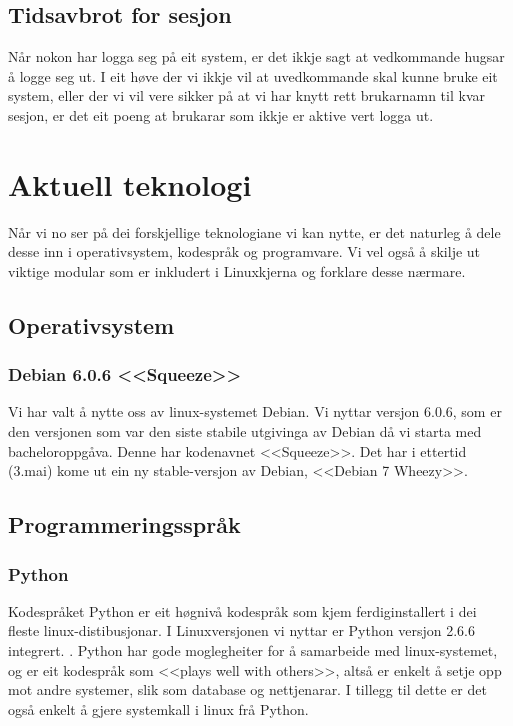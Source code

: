 \documentclass[nynorsk,12pt,a4paper,oneside]{book}
\begin{document}
\subsection{Tidsavbrot for sesjon}
Når nokon har logga seg på eit system, er det ikkje sagt at vedkommande hugsar å logge seg ut. I eit høve der vi ikkje vil at uvedkommande skal kunne bruke eit system, eller der vi vil vere sikker på at vi har knytt rett brukarnamn til kvar sesjon, er det eit poeng at brukarar som ikkje er aktive vert logga ut. 

\section{Aktuell teknologi}
Når vi no ser på dei forskjellige teknologiane vi kan nytte, er det naturleg å dele desse inn i operativsystem, kodespråk og programvare. Vi vel også å skilje ut viktige modular som er inkludert i Linuxkjerna og forklare desse nærmare.
\subsection{Operativsystem}
\subsubsection{Debian 6.0.6 <<Squeeze>>} 
Vi har valt å nytte oss av linux-systemet Debian. Vi nyttar versjon 6.0.6, som er den versjonen som var den siste stabile utgivinga av Debian då vi starta med bacheloroppgåva. Denne har kodenavnet <<Squeeze>>. Det har i ettertid (3.mai) kome ut ein ny stable-versjon av Debian, <<Debian 7 Wheezy>>. \cite{wheezy}

\subsection{Programmeringsspråk}
\subsubsection{Python}
Kodespråket Python er eit høgnivå kodespråk som kjem ferdiginstallert i dei fleste linux-distibusjonar. I Linuxversjonen vi nyttar er Python versjon 2.6.6 integrert. \cite{pythonversjon}. 
Python har gode moglegheiter for å samarbeide med linux-systemet, og er eit kodespråk som <<plays well with others>>, altså er enkelt å setje opp mot andre systemer, slik som database og nettjenarar. \cite{python, pythonapps} I tillegg til dette er det også enkelt å gjere systemkall i linux frå Python. \cite{pythonsubprocess}
\end{document}
